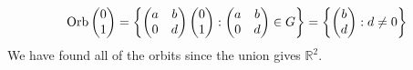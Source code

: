 \begin{itemize}
	      \[
		      \operatorname{Orb}\begin{pmatrix}
			      0 \\ 1
		      \end{pmatrix} = \left\{ \begin{pmatrix}
			      a & b \\ 0 & d
		      \end{pmatrix} \begin{pmatrix}
			      0 \\ 1
		      \end{pmatrix}: \begin{pmatrix}
			      a & b \\ 0 & d
		      \end{pmatrix} \in G \right\} = \left\{ \begin{pmatrix}
			      b \\ d
		      \end{pmatrix}: d \neq 0 \right\}
	      \]
	      We have found all of the orbits since the union gives \(\mathbb R^2\).
\end{itemize}
